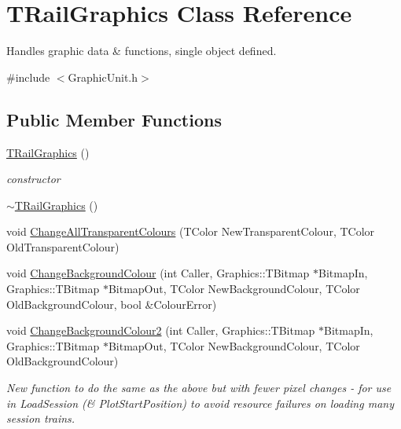 \hypertarget{class_t_rail_graphics}{}\section{T\+Rail\+Graphics Class Reference}
\label{class_t_rail_graphics}


Handles graphic data \& functions, single object defined.  




{\ttfamily \#include $<$Graphic\+Unit.\+h$>$}

\subsection*{Public Member Functions}
\begin{DoxyCompactItemize}
\item 
\mbox{\label{class_t_rail_graphics_acd3dfcf9686870772b1708030f11b1d4}} 
\mbox{\hyperlink{class_t_rail_graphics_acd3dfcf9686870772b1708030f11b1d4}{T\+Rail\+Graphics}} ()
\begin{DoxyCompactList}\small\item\em constructor \end{DoxyCompactList}\item 
\mbox{\hyperlink{class_t_rail_graphics_ad243415e657236ecca97fa1d064cf127}{$\sim$\+T\+Rail\+Graphics}} ()
\item 
void \mbox{\hyperlink{class_t_rail_graphics_a5121c6d8b8fa69eefc293ca51cddce88}{Change\+All\+Transparent\+Colours}} (T\+Color New\+Transparent\+Colour, T\+Color Old\+Transparent\+Colour)
\item 
void \mbox{\hyperlink{class_t_rail_graphics_a74d7dcd5e17ef156d8c216c8e524de11}{Change\+Background\+Colour}} (int Caller, Graphics\+::\+T\+Bitmap $\ast$Bitmap\+In, Graphics\+::\+T\+Bitmap $\ast$Bitmap\+Out, T\+Color New\+Background\+Colour, T\+Color Old\+Background\+Colour, bool \&Colour\+Error)
\item 
\mbox{\label{class_t_rail_graphics_ad718b35b6e9f7c36138d234a29da2b37}} 
void \mbox{\hyperlink{class_t_rail_graphics_ad718b35b6e9f7c36138d234a29da2b37}{Change\+Background\+Colour2}} (int Caller, Graphics\+::\+T\+Bitmap $\ast$Bitmap\+In, Graphics\+::\+T\+Bitmap $\ast$Bitmap\+Out, T\+Color New\+Background\+Colour, T\+Color Old\+Background\+Colour)
\begin{DoxyCompactList}\small\item\em New function to do the same as the above but with fewer pixel changes -\/ for use in Load\+Session (\& Plot\+Start\+Position) to avoid resource failures on loading many session trains. \end{DoxyCompactList}\item 

\end{DoxyCompactItemize}
